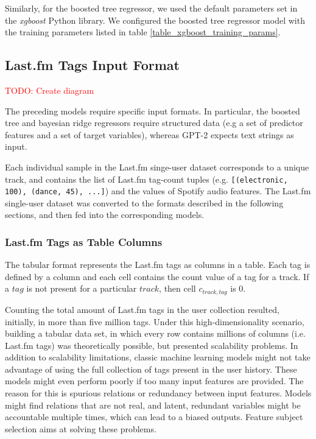 \documentclass[sn-mathphys]{sn-jnl}%
\theoremstyle{thmstyleone}%
\theoremstyle{thmstyletwo}%
\theoremstyle{thmstylethree}%
\begin{document}
Similarly, for the boosted tree regressor, we used the default parameters set in the \emph{xgboost} Python library.
We configured the boosted tree regressor model with the training parameters listed in table \ref{table_xgboost_training_params}.

\subsection{Last.fm Tags Input Format}

\textcolor{red}{TODO: Create diagram}

The preceding models require specific input formats.
In particular, the boosted tree and bayesian ridge regressors require structured data (e.g a set of predictor features and a set of target variables), whereas GPT-2 expects text strings as input.

Each individual sample in the Last.fm singe-user dataset corresponds to a unique track,
and contains the list of Last.fm tag-count tuples (e.g. \verb|[(electronic, 100), (dance, 45), ...]|)
and the values of Spotify audio features.
The Last.fm single-user dataset was converted to the formats described in the following sections, and then fed into the corresponding models.


\subsubsection{Last.fm Tags as Table Columns}
The tabular format represents the Last.fm tags as columns in a table.
Each tag is defined by a column and each cell contains the count value of a tag for a track.
If a $tag$ is not present for a particular $track$, then cell $c_{track,tag}$ is \num{0}.

Counting the total amount of Last.fm tags in the user collection resulted, initially, in more than five million tags.
Under this high-dimensionality scenario, building a tabular data set, in which every row contains millions of columns (i.e. Last.fm tags) was theoretically possible, but presented scalability problems.
In addition to scalability limitations, classic machine learning models might not take advantage of using the full collection of tags present in the user history.
These models might even perform poorly if too many input features are provided.
The reason for this is spurious relations or redundancy  between input features.
Models might find relations that are not real, and latent, redundant variables might be accountable multiple times, which can lead to a biased outputs.
Feature subject selection aims at solving these problems.
\end{document}
